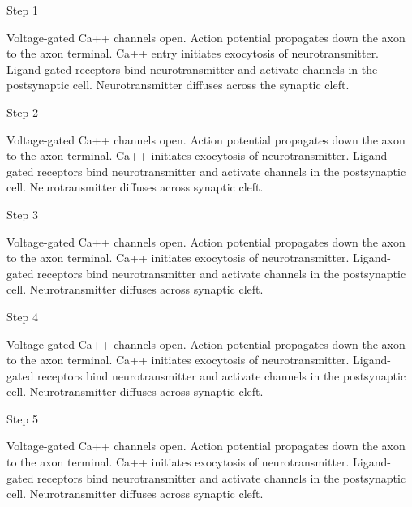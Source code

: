 \documentclass[answers]{exam}
\begin{document}
\begin{questions}

\question Step 1
\begin{choices}
\choice Voltage-gated Ca++ channels open.
\correctchoice Action potential propagates down the axon to the axon terminal.
\choice Ca++ entry initiates exocytosis of neurotransmitter.
\choice Ligand-gated receptors bind neurotransmitter and activate channels in the postsynaptic cell.
\choice Neurotransmitter diffuses across the synaptic cleft.
\end{choices}

\question Step 2
\begin{choices}
\correctchoice Voltage-gated Ca++ channels open.
\choice Action potential propagates down the axon to the axon terminal.
\choice Ca++ initiates exocytosis of neurotransmitter.
\choice Ligand-gated receptors bind neurotransmitter and activate channels in the postsynaptic cell.
\choice Neurotransmitter diffuses across synaptic cleft.
\end{choices}

\question Step 3
\begin{choices}
\choice Voltage-gated Ca++ channels open.
\choice Action potential propagates down the axon to the axon terminal.
\correctchoice Ca++ initiates exocytosis of neurotransmitter.
\choice Ligand-gated receptors bind neurotransmitter and activate channels in the postsynaptic cell.
\choice Neurotransmitter diffuses across synaptic cleft.
\end{choices}

\question Step 4
\begin{choices}
\choice Voltage-gated Ca++ channels open.
\choice Action potential propagates down the axon to the axon terminal.
\choice Ca++ initiates exocytosis of neurotransmitter.
\choice Ligand-gated receptors bind neurotransmitter and activate channels in the postsynaptic cell.
\correctchoice Neurotransmitter diffuses across synaptic cleft.
\end{choices}

\question Step 5
\begin{choices}
\choice Voltage-gated Ca++ channels open.
\choice Action potential propagates down the axon to the axon terminal.
\choice Ca++ initiates exocytosis of neurotransmitter.
\correctchoice Ligand-gated receptors bind neurotransmitter and activate channels in the postsynaptic cell.
\choice Neurotransmitter diffuses across synaptic cleft.
\end{choices}


\end{questions}
\end{document}

